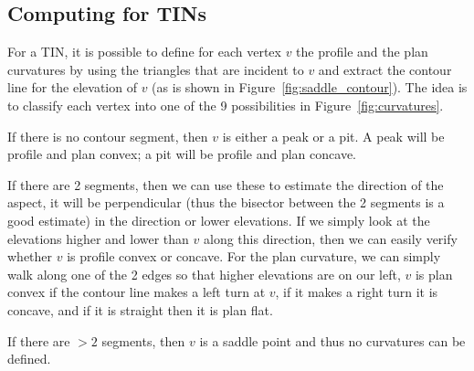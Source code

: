 \subsection{Computing for TINs}

For a TIN, it is possible to define for each vertex $v$ the profile and the plan curvatures by using the triangles that are incident to $v$ and extract the contour line for the elevation of $v$ (as is shown in Figure~\ref{fig:saddle_contour}).
The idea is to classify each vertex into one of the 9 possibilities in Figure~\ref{fig:curvatures}.

If there is no contour segment, then $v$ is either a peak or a pit.
A peak will be profile and plan convex; a pit will be profile and plan concave.

If there are 2 segments, then we can use these to estimate the direction of the aspect, it will be perpendicular (thus the bisector between the 2 segments is a good estimate) in the direction or lower elevations.
If we simply look at the elevations higher and lower than $v$ along this direction, then we can easily verify whether $v$ is profile convex or concave.
For the plan curvature, we can simply walk along one of the 2 edges so that higher elevations are on our left, $v$ is plan convex if the contour line makes a left turn at $v$, if it makes a right turn it is concave, and if it is straight then it is plan flat.

If there are $>2$ segments, then $v$ is a saddle point and thus no curvatures can be defined.

%


